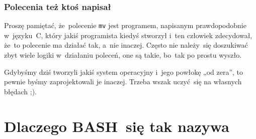 \documentclass[10pt,t]{beamer}
\begin{document}
\begin{frame}
  \frametitle{Polecenia też ktoś napisał}


  Proszę pamiętać, że~polecenie \texttt{mv} jest programem, napisanym
  prawdopodobnie w~języku~C, który jakiś programista kiedyś stworzył i~ten
  człowiek zdecydował, że~to polecenie ma działać tak, a~nie inaczej.
  Często nie należy~się doszukiwać zbyt wiele logiki w~działaniu poleceń,
  one są takie, bo~tak po prostu wyszło.

  Gdybyśmy dziś tworzyli jakiś system operacyjny i~jego powłokę „od zera”,
  to pewnie byśmy zaprojektowali je inaczej. Trzeba wszak uczyć~się na
  własnych błędach ;).

\end{frame}










\appendix















\section{Dlaczego BASH~się tak nazywa}
\end{document}
